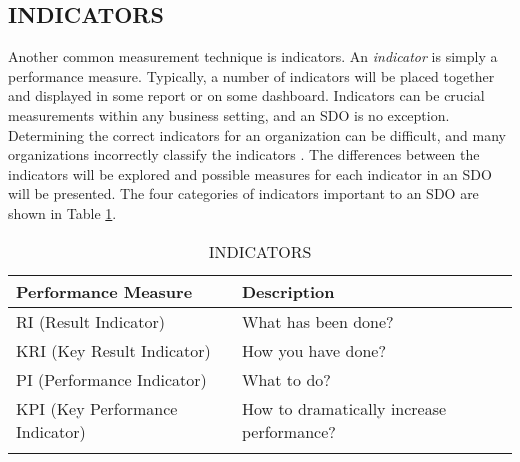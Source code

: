 \documentclass[SDSUThesis.tex]{subfiles}
\begin{document}
    \subsection{INDICATORS}
    \label{sec:indicators}
        Another common measurement technique is indicators. An
        \textit{indicator} is simply a performance measure. 
        Typically, a number of indicators will be placed
        together and displayed in some report or on some
        dashboard. 
        Indicators can be crucial measurements
        within any business setting, and an SDO is no exception. Determining
        the correct indicators for an organization can
        be difficult, and many organizations incorrectly classify
        the indicators \cite{parmenter2010}.  
        The differences between the indicators will be explored and
        possible measures for each indicator in an SDO will be
        presented.   The four
        categories of indicators important to an SDO are shown
        in Table \ref{tab:indicators}.
        
        
        \begin{longtable}{@{}l l}
            \toprule%
             \centering%
             {\bfseries Performance Measure}
             & {\bfseries Description}\\
            
            \cmidrule[0.4pt](r{0.125em}){1-1}%
            \cmidrule[0.4pt](lr{0.125em}){2-2}%
            \endhead
            
            RI (Result Indicator) & What has been done?   \\
            \myrowcolour%
            KRI (Key Result Indicator) & How you have done? \\
            PI (Performance Indicator) & What to do? \\
            \myrowcolour%
            KPI (Key Performance Indicator) & How to dramatically increase performance? \\
            
            \bottomrule
            
            \caption{INDICATORS}
            \label{tab:indicators}
        \end{longtable}
            
\end{document}
